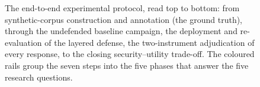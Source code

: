 \begin{figure}[htbp]
\caption[The end-to-end experimental protocol]{The end-to-end experimental protocol, read top to
bottom: from synthetic-corpus construction and annotation (the ground truth), through the undefended
baseline campaign, the deployment and re-evaluation of the layered defense, the two-instrument
adjudication of every response, to the closing security--utility trade-off. The coloured rails group
the seven steps into the five phases that answer the five research questions.}
\label{fig:ch6-protocol}
\end{figure}
